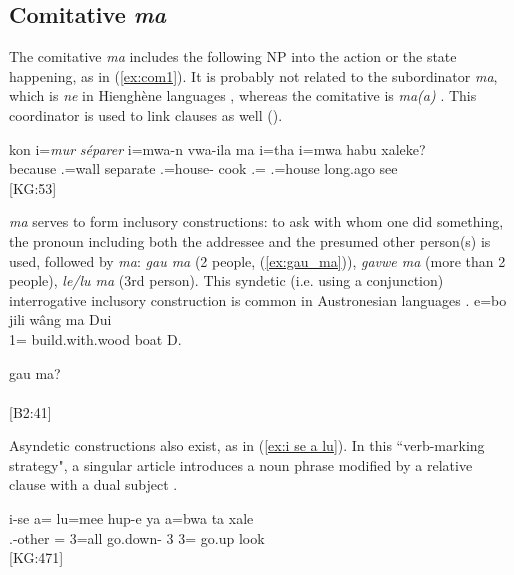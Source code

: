  \subsection{Comitative \textit{ma} }
\label{ssec:comNP}
The comitative \textit{ma} includes the following NP into the action or the state happening, as in (\ref{ex:com1}). It is probably not related to the subordinator \textit{ma}, which is \textit{ne} in Hienghène languages \parencite[258]{haudricourt_dictionnaire_1982}, whereas the comitative is \textit{ma(a)} \parencite[259]{haudricourt_dictionnaire_1982}. This coordinator is used to link  clauses as well ().

\ea \label{ex:com1} %
\gll kon i=\textit{mur} \textit{séparer} i=mwa-n vwa-ila ma i=tha i=mwa habu xaleke?\\
 because .=wall separate .=house- cook  .= .=house long.ago see\\
\glt {} {[KG:53]}
\z

\textit{ma} serves to form inclusory constructions: to ask with whom one did something, the pronoun including both the addressee and the presumed other person(s) is used, followed by \textit{ma}: \textit{gau ma}  (2 people, (\ref{ex:gau_ma})), \textit{gavwe ma}  (more than 2 people), \textit{le/lu ma}  (3rd person). This syndetic (i.e. using a conjunction) interrogative inclusory construction is common in Austronesian languages \parencite[244--257]{bril_noun-phrase_2011}. 
	\ea
	\gll e=bo jili wâng ma Dui\\
	 1= build.with.wood boat  D.\\
	\glt {}
	\z	
	
	\ea\label{ex:gau_ma} 
	\gll gau ma?\\
	  \\
	\glt {} {[B2:41]}
	\z

Asyndetic constructions also exist, as in (\ref{ex:i se a lu}). In this ``verb-marking strategy", a singular article introduces a noun phrase modified by a relative clause with a dual subject \parencite[244--245]{bril_noun-phrase_2011}.

\ea \label{ex:i se a lu}
\gll i-se a= lu=mee hup-e ya a=bwa ta xale\\
 .-other = 3=all go.down- 3 3= go.up look\\
\glt {} {[KG:471]}
\z

